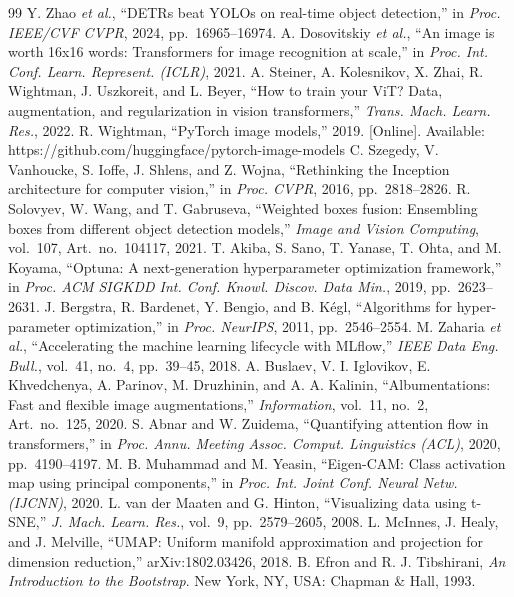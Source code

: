 \IfFileExists{IEEEtran.cls}{\documentclass[conference]{IEEEtran}}%
\begin{document}
\begin{thebibliography}{99}
 Y. Zhao \emph{et al.}, ``DETRs beat YOLOs on real-time object detection,'' in \emph{Proc. IEEE/CVF CVPR}, 2024, pp.~16965--16974.
 A. Dosovitskiy \emph{et al.}, ``An image is worth 16x16 words: Transformers for image recognition at scale,'' in \emph{Proc. Int. Conf. Learn. Represent. (ICLR)}, 2021.
 A. Steiner, A. Kolesnikov, X. Zhai, R. Wightman, J. Uszkoreit, and L. Beyer, ``How to train your ViT? Data, augmentation, and regularization in vision transformers,'' \emph{Trans. Mach. Learn. Res.}, 2022.
 R. Wightman, ``PyTorch image models,'' 2019. [Online]. Available: https://github.com/huggingface/pytorch-image-models
 C. Szegedy, V. Vanhoucke, S. Ioffe, J. Shlens, and Z. Wojna, ``Rethinking the Inception architecture for computer vision,'' in \emph{Proc. CVPR}, 2016, pp.~2818--2826.
 R. Solovyev, W. Wang, and T. Gabruseva, ``Weighted boxes fusion: Ensembling boxes from different object detection models,'' \emph{Image and Vision Computing}, vol.~107, Art.~no.~104117, 2021.
 T. Akiba, S. Sano, T. Yanase, T. Ohta, and M. Koyama, ``Optuna: A next-generation hyperparameter optimization framework,'' in \emph{Proc. ACM SIGKDD Int. Conf. Knowl. Discov. Data Min.}, 2019, pp.~2623--2631.
 J. Bergstra, R. Bardenet, Y. Bengio, and B. K\'egl, ``Algorithms for hyper-parameter optimization,'' in \emph{Proc. NeurIPS}, 2011, pp.~2546--2554.
 M. Zaharia \emph{et al.}, ``Accelerating the machine learning lifecycle with MLflow,'' \emph{IEEE Data Eng. Bull.}, vol.~41, no.~4, pp.~39--45, 2018.
 A. Buslaev, V. I. Iglovikov, E. Khvedchenya, A. Parinov, M. Druzhinin, and A. A. Kalinin, ``Albumentations: Fast and flexible image augmentations,'' \emph{Information}, vol.~11, no.~2, Art.~no.~125, 2020.
 S. Abnar and W. Zuidema, ``Quantifying attention flow in transformers,'' in \emph{Proc. Annu. Meeting Assoc. Comput. Linguistics (ACL)}, 2020, pp.~4190--4197.
 M. B. Muhammad and M. Yeasin, ``Eigen-CAM: Class activation map using principal components,'' in \emph{Proc. Int. Joint Conf. Neural Netw. (IJCNN)}, 2020.
 L. van der Maaten and G. Hinton, ``Visualizing data using t-SNE,'' \emph{J. Mach. Learn. Res.}, vol.~9, pp.~2579--2605, 2008.
 L. McInnes, J. Healy, and J. Melville, ``UMAP: Uniform manifold approximation and projection for dimension reduction,'' arXiv:1802.03426, 2018.
 B. Efron and R. J. Tibshirani, \emph{An Introduction to the Bootstrap}. New York, NY, USA: Chapman \& Hall, 1993.
\end{thebibliography}
\end{document}
